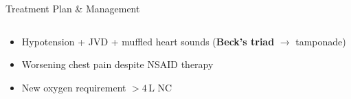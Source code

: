 \begin{frame}{Treatment Plan \& Management}
\begin{columns}[T]
    \vspace{0.2cm}

    \begin{tcolorbox}[alertbox,title={\faBell\hspace{4pt}Red Flags -- Escalate Immediately}]
      \small
      \begin{itemize}
        \item Hypotension + JVD + muffled heart sounds (\textbf{Beck's triad} $\rightarrow$ tamponade)
        \item Worsening chest pain despite NSAID therapy
        \item New oxygen requirement $>4$\,L NC
      \end{itemize}
    \end{tcolorbox}
  \end{columns}
\end{frame}
